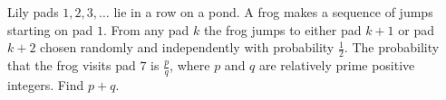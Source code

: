 Lily pads $1,2,3,\ldots$ lie in a row on a pond.  A frog makes a sequence of jumps starting on pad $1$.  From any pad $k$ the frog jumps to either pad $k+1$ or pad $k+2$ chosen randomly and independently with probability $\tfrac12$.  The probability that the frog visits pad $7$ is $\tfrac pq$, where $p$ and $q$ are relatively prime positive integers.  Find $p+q$.